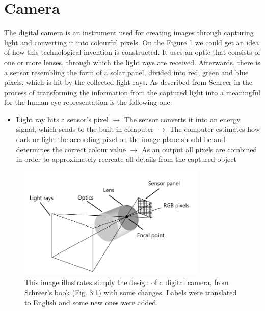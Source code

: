 \section{Camera}\label{camera_section}
The digital camera is an instrument used for creating images through capturing light and converting it into colourful pixels. On the Figure \ref{fig:camera_construction} we could get an idea of how this technological invention is constructed. It uses an optic that consists of one or more lenses, through which the light rays are received. Afterwards, there is a sensor resembling the form of a solar panel, divided into red, green and blue pixels, which is hit by the collected light rays. As described from Schreer in \cite{camera_pinhole_model} the process of transforming the information from the captured light into a meaningful for the human eye representation is the following one: 
\begin{itemize}
    \item Light ray hits a sensor's pixel $\rightarrow$ The sensor converts it into an energy signal, which sends to the built-in computer $\rightarrow$ The computer estimates how dark or light the according pixel on the image plane should be and determines the correct colour value $\rightarrow$ As an output all pixels are combined in order to approximately recreate all details from the captured object  
\end{itemize}

\begin{figure}[h]
\centering
\includegraphics[width=0.8\textwidth]{images/camera_construction.png}
\caption[Digital camera's design]{This image illustrates simply the design of a digital camera, from Schreer's book \cite{camera_pinhole_model} (Fig. 3.1) with some changes. Labels were translated to English and some new ones were added. \label{fig:camera_construction}}
\end{figure}

